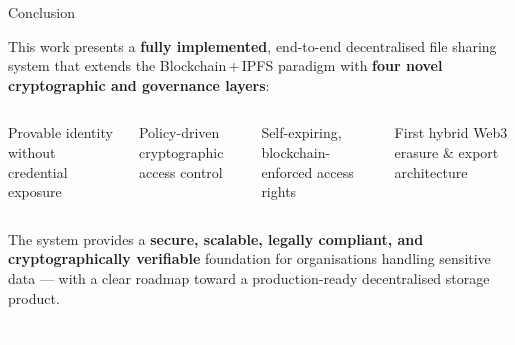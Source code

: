 \documentclass[aspectratio=169]{beamer}
\begin{document}
\begin{frame}{Conclusion}
\begin{tcolorbox}[navybox]
\scriptsize
This work presents a \textbf{fully implemented}, end-to-end decentralised file sharing system that extends
the Blockchain\,+\,IPFS paradigm with \textbf{four novel cryptographic and governance layers}:
\end{tcolorbox}

\vspace{0.06cm}
\begin{columns}[t]
\begin{tcolorbox}[bluebox, title=\textbf{ZKP}]
\scriptsize Provable identity without credential exposure
\end{tcolorbox}
\vspace{0.06cm}
\begin{tcolorbox}[greenbox, title=\textbf{CP-ABE}]
\scriptsize Policy-driven cryptographic access control
\end{tcolorbox}
\begin{tcolorbox}[orangebox, title=\textbf{Time-Bound Permissions}]
\scriptsize Self-expiring, blockchain-enforced access rights
\end{tcolorbox}
\vspace{0.06cm}
\begin{tcolorbox}[redbox, title=\textbf{GDPR Module}]
\scriptsize First hybrid Web3 erasure \& export architecture
\end{tcolorbox}
\end{columns}

\vspace{0.08cm}
\begin{tcolorbox}[navybox]
\centering\small
The system provides a \textbf{secure, scalable, legally compliant, and cryptographically verifiable}
foundation for organisations handling sensitive data --- with a clear roadmap toward a
production-ready decentralised storage product.
\end{tcolorbox}
\end{frame}

\begin{frame}[plain]
\vspace{2.2cm}
\centering
{\Huge\textbf{\textcolor{white}{Thank You}}}\\[0.5cm]


\end{frame}

\end{document}
